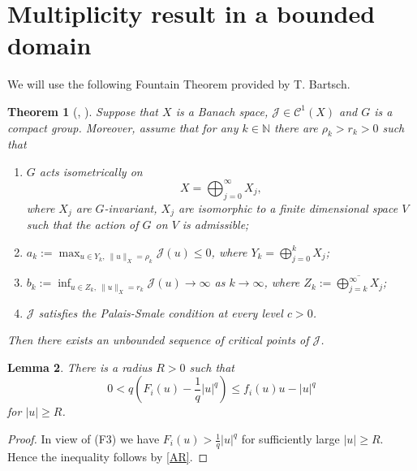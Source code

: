 \documentclass{scrartcl}
\newtheorem{Th}{Theorem}[section]
\newtheorem{Lem}[Th]{Lemma}
\newcommand{\cC}{{\mathcal C}}
\newcommand{\cJ}{{\mathcal J}}
\numberwithin{equation}{section}
\begin{document}
\section{Multiplicity result in a bounded domain}\label{sect:4}

We will use the following Fountain Theorem provided by T. Bartsch. 

\begin{Th}[\cite{Bartsch}, {\cite[Theorem 3.6]{Willem}}]\label{Th:Bartsch}
Suppose that $X$ is a Banach space, $\cJ \in \cC^1 (X)$ and $G$ is a compact group. Moreover, assume that for any $k \in \mathbb{N}$ there are $\rho_k > r_k > 0$ such that
\begin{enumerate}
\item[(B1)] $G$ acts isometrically on
$$
X = \bigoplus_{j =0}^\infty X_j,
$$
where $X_j$ are $G$-invariant, $X_j$ are isomorphic to a finite dimensional space $V$ such that the action of $G$ on $V$ is admissible;
\item[(B2)] $a_k := \max_{u \in Y_k, \ \|u\|_X = \rho_k} \cJ(u) \leq 0$, where $Y_k = \bigoplus_{j=0}^k X_j$;
\item[(B3)] $b_k := \inf_{u \in Z_k, \ \|u\|_X = r_k} \cJ(u) \to \infty$ as $k \to \infty$, where $Z_k := \overline{\bigoplus_{j=k}^\infty X_j}$;
\item[(B4)] $\cJ$ satisfies the Palais-Smale condition at every level $c > 0$. 
\end{enumerate}
Then there exists an unbounded sequence of critical points of $\cJ$.
\end{Th}

\begin{Lem}\label{lemR}
There is a radius $R > 0$ such that
$$
0 < q \left( F_i(u) - \frac{1}{q} |u|^q \right) \leq f_i(u)u - |u|^q
$$
for $|u| \geq R$.
\end{Lem}

\begin{proof}
In view of (F3) we have $F_i (u) > \frac{1}{q} |u|^q$ for sufficiently large $|u| \geq R$. Hence the inequality follows by \eqref{AR}.
\end{proof}
\end{document}
